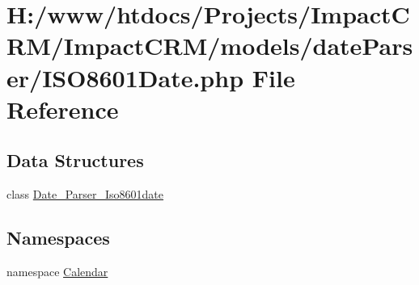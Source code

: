 \hypertarget{ISO8601Date_8php}{
\section{H:/www/htdocs/Projects/ImpactCRM/ImpactCRM/models/dateParser/ISO8601Date.php File Reference}
\label{ISO8601Date_8php}
}
\subsection*{Data Structures}
\begin{DoxyCompactItemize}
\item 
class \hyperlink{classDate__Parser__Iso8601date}{Date\_\-Parser\_\-Iso8601date}
\end{DoxyCompactItemize}
\subsection*{Namespaces}
\begin{DoxyCompactItemize}
\item 
namespace \hyperlink{namespaceCalendar}{Calendar}
\end{DoxyCompactItemize}
